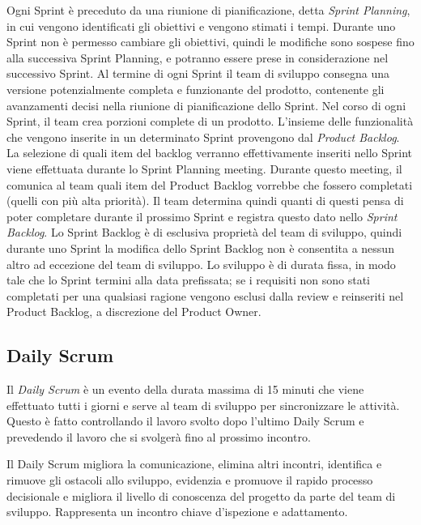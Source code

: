 \documentclass{article}
\begin{document}
Ogni Sprint è preceduto da una riunione di pianificazione, detta \textit{Sprint Planning}, in cui vengono identificati 
gli obiettivi e vengono stimati i tempi.
Durante uno Sprint non è permesso cambiare gli obiettivi, quindi le modifiche sono sospese fino alla successiva Sprint Planning, 
e potranno essere prese in considerazione nel successivo Sprint.
Al termine di ogni Sprint il team di sviluppo consegna una versione potenzialmente completa e funzionante del prodotto, 
contenente gli avanzamenti decisi nella riunione di pianificazione dello Sprint.
Nel corso di ogni Sprint, il team crea porzioni complete di un prodotto. 
L'insieme delle funzionalità che vengono inserite in un determinato Sprint provengono dal \textit{Product Backlog}. 
La selezione di quali item del backlog verranno effettivamente inseriti nello Sprint viene effettuata durante lo Sprint Planning meeting. 
Durante questo meeting, il  comunica al team quali item del Product Backlog vorrebbe che fossero completati (quelli con più alta priorità). 
Il team determina quindi quanti di questi pensa di poter completare durante il prossimo Sprint e registra questo dato nello \textit{Sprint Backlog}.
Lo Sprint Backlog è di esclusiva proprietà del team di sviluppo, quindi durante uno Sprint la modifica dello Sprint Backlog non è consentita 
a nessun altro ad eccezione del team di sviluppo. 
Lo sviluppo è di durata fissa, in modo tale che lo Sprint termini alla data prefissata; se i requisiti non sono stati completati 
per una qualsiasi ragione vengono esclusi dalla review e reinseriti nel Product Backlog, a discrezione del Product Owner.

\subsection{Daily Scrum}

Il \textit{Daily Scrum} è un evento della durata massima di 15 minuti che viene effettuato tutti i giorni e 
serve al team di sviluppo per sincronizzare le attività. Questo è fatto controllando il lavoro svolto dopo 
l'ultimo Daily Scrum e prevedendo il lavoro che si svolgerà fino al prossimo incontro.

Il Daily Scrum migliora la comunicazione, elimina altri incontri, identifica e rimuove gli ostacoli allo
sviluppo, evidenzia e promuove il rapido processo decisionale e migliora il livello di conoscenza del
progetto da parte del team di sviluppo. Rappresenta un incontro chiave d'ispezione e adattamento.
\end{document}
